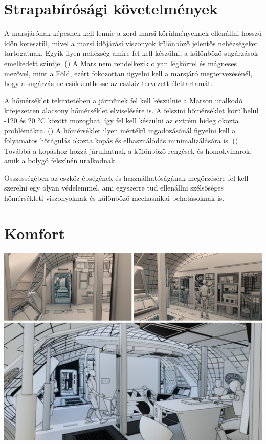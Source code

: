 \documentclass[12pt]{report}
\begin{document}
\section{Strapabírósági követelmények} \label{strapabirosag}
A marsjárónak képesnek kell lennie a zord marsi körülményeknek ellenállni hosszú időn keresztül, mivel a marsi időjárási viszonyok különböző jelentős nehézségeket tartogatnak. Egyik ilyen nehézség amire fel kell készülni, a különböző sugárzások emelkedett szintje. () A Mars nem rendelkezik olyan légkörrel és 
mágneses mezővel, mint a Föld, ezért fokozottan ügyelni kell a marsjáró megtervezésénél, hogy a sugárzás ne csökkenthesse az eszköz tervezett élettartamát. 

A hőmérséklet tekintetében a járműnek fel kell készülnie a Marson uralkodó kifejezetten alacsony hőmérséklet elviselésére is. A felszíni hőmérséklet körülbelül  -120 és 20 °C között mozoghat, így fel kell készülni az extrém hideg okozta problémákra. () A hőmérséklet ilyen mértékű ingadozásánál figyelni kell a folyamatos hőtágulás okozta kopás és elhasználódás minimalizálására is. () Továbbá a kopáshoz hozzá járulhatnak a különböző rengések és homokviharok, amik a bolygó felszínén uralkodnak.

Összességében az eszköz épségének és használhatóságának megőrzésére fel kell szerelni egy olyan védelemmel, ami egyszerre tud ellenállni szélsőséges hőmérsékleti viszonyoknak és különböző mechasnikai behatásoknak is.


\section{Komfort}

\includegraphics[scale=0.7]{images/calpoly_vr.png}
\end{document}
